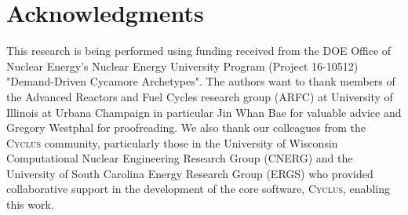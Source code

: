 \documentclass{anstrans}
\newcommand{\Cyclus}{\textsc{Cyclus}\xspace}%
\begin{document}
\section{Acknowledgments}
This research is being performed using funding received from the DOE Office of Nuclear Energy's
Nuclear Energy University Program (Project 16-10512) "Demand-Driven Cycamore Archetypes". The authors want to thank members of the Advanced Reactors and Fuel Cycles research group (ARFC) at University of Illinois at Urbana Champaign in particular Jin Whan Bae for valuable advice and Gregory Westphal for proofreading. We also thank our colleagues from the \Cyclus community, particularly those in the University of Wisconsin Computational Nuclear Engineering Research Group (CNERG) and the University of South Carolina Energy Research Group (ERGS) who provided collaborative support in the development of the core software, \Cyclus, enabling this work. 



\end{document}
